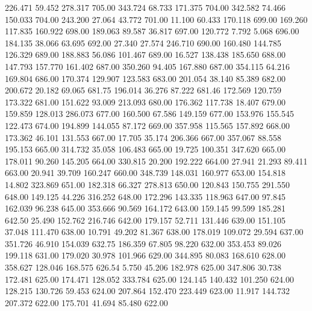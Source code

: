  226.471   59.452  278.317       705.00
 343.724   68.733  171.375       704.00
 342.582   74.466  150.033       704.00
 243.200   27.064   43.772       701.00
  11.100   60.433  170.118       699.00
 169.260  117.835  160.922       698.00
 189.063   89.587   36.817       697.00
 120.772    7.792    5.068       696.00
 184.135   38.066   63.695       692.00
  27.340   27.574  246.710       690.00
 160.480  144.785  126.329       689.00
 188.883   56.086  101.467       689.00
  16.527  138.438  185.650       688.00
 147.793  157.770  161.402       687.00
 350.260   94.405  167.880       687.00
 354.115   64.216  169.804       686.00
 170.374  129.907  123.583       683.00
 201.054   38.140   85.389       682.00
 200.672   20.182   69.065       681.75
 196.014   36.276   87.222       681.46
 172.569  120.759  173.322       681.00
 151.622   93.009  213.093       680.00
 176.362  117.738   18.407       679.00
 159.859  128.013  286.073       677.00
 160.500   67.586  149.159       677.00
 153.976  155.545  122.473       674.00
 194.899  144.055   87.172       669.00
 357.958  115.565  157.892       668.00
 173.362   46.101  131.553       667.00
  17.705   35.174  206.366       667.00
 357.067   88.558  195.153       665.00
 314.732   35.058  106.483       665.00
  19.725  100.351  347.620       665.00
 178.011   90.260  145.205       664.00
 330.815   20.200  192.222       664.00
  27.941   21.293   89.411       663.00
  20.941   39.709  160.247       660.00
 348.739  148.031  160.977       653.00
 154.818   14.802  323.869       651.00
 182.318   66.327  278.813       650.00
 120.843  150.755  291.550       648.00
 149.125   44.226  316.252       648.00
 172.296  143.335  118.963       647.00
  97.845  162.039   96.238       645.00
 353.666   90.569  164.172       643.00
 159.145   99.599  185.281       642.50
  25.490  152.762  216.746       642.00
 179.157   52.711  131.446       639.00
 151.105   37.048  111.470       638.00
  10.791   49.202   81.367       638.00
 178.019  109.072   29.594       637.00
 351.726   46.910  154.039       632.75
 186.359   67.805   98.220       632.00
 353.453   89.026  199.118       631.00
 179.020   30.978  101.966       629.00
 344.895   80.083  168.610       628.00
 358.627  128.046  168.575       626.54
   5.750   45.206  182.978       625.00
 347.806   30.738  172.481       625.00
 174.471  128.052  333.784       625.00
 124.145  140.432  101.250       624.00
 128.215  130.726   59.453       624.00
 207.864  152.470  223.449       623.00
  11.917  144.732  207.372       622.00
 175.701   41.694   85.480       622.00
